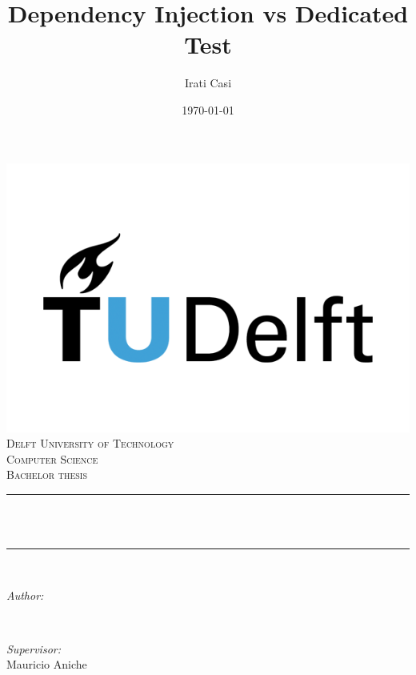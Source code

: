\documentclass[11pt, a4paper, twocolumn]{article}
\title{Dependency Injection vs Dedicated Test}
\author{Irati Casi}
\date{\today}
\makeatletter
\let\thetitle\@title
\let\theauthor\@author
\let\thedate\@date
\makeatother
\begin{document}

\begin{titlepage}
	\centering
    \vspace*{2 cm}
    \includegraphics[scale = 0.25]{tu-delft.png}\\[1.0 cm]
    \textsc{\LARGE Delft University of Technology}\\[2.0 cm]
	\textsc{\Large Computer Science}\\[0.5 cm]
	\textsc{\large Bachelor thesis}\\[0.5 cm]
	\rule{\linewidth}{0.2 mm} \\[0.4 cm]
	{ \huge 
	\bfseries 
	\thetitle}\\
	\rule{\linewidth}{0.2 mm} \\[1.5 cm]
	
	\begin{minipage}{0.4\textwidth}
		\begin{flushleft} \large
			\emph{Author:}\\
			\theauthor
			\end{flushleft}
			\end{minipage}~
			\begin{minipage}{0.4\textwidth}
			\begin{flushright} \large
			\emph{Supervisor:} \\
			Mauricio Aniche	
		\end{flushright}
	\end{minipage}\\[2 cm]
	
	{\large \thedate}\\[2 cm]
 
	\vfill
	
\end{titlepage}
\end{document}
